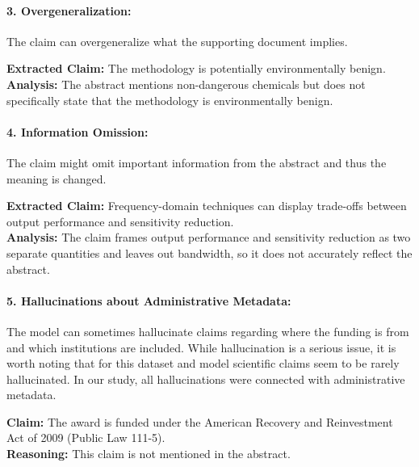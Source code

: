 \documentclass[11pt]{article}
\begin{document}
\paragraph{3. Overgeneralization:}
The claim can overgeneralize what the supporting document implies.

{\small
\begin{tcolorbox}[title={\textbf{Award ID:} 0957482}]
\textbf{Extracted Claim:} The methodology is potentially environmentally benign.\\
\textbf{Analysis:} The abstract mentions non-dangerous chemicals but does not specifically state that the methodology is environmentally benign.
\end{tcolorbox}
}

\paragraph{4. Information Omission:}
The claim might omit important information from the abstract and thus the meaning is changed.

{\small
\begin{tcolorbox}[title={\textbf{Award ID:} 9409461}]
\textbf{Extracted Claim:} Frequency-domain techniques can display trade-offs between output performance and sensitivity reduction.\\
\textbf{Analysis:} The claim frames output performance and sensitivity reduction as two separate quantities and leaves out bandwidth, so it does not accurately reflect the abstract.
\end{tcolorbox}
}

\paragraph{5. Hallucinations about Administrative Metadata:}
The model can sometimes hallucinate claims regarding where the funding is from and which institutions are included. While hallucination is a serious issue, it is worth noting that for this dataset and model scientific claims seem to be rarely hallucinated. In our study, all hallucinations were connected with administrative metadata.

\begin{tcolorbox}[title={\textbf{Award ID:} 0542751}]
\textbf{Claim:} The award is funded under the American Recovery and Reinvestment Act of 2009 (Public Law 111-5).\\
\textbf{Reasoning:} This claim is not mentioned in the abstract.
\end{tcolorbox}
\end{document}
